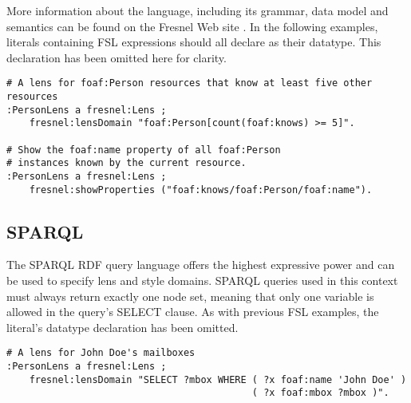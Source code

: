 More information about the language, including its grammar, data model and semantics can be found on the Fresnel Web site \cite{fsl05}. In the following examples, literals containing FSL expressions should all declare  as their datatype. This declaration has been omitted here for clarity.

\begin{small}
\begin{verbatim}
# A lens for foaf:Person resources that know at least five other resources
:PersonLens a fresnel:Lens ;
    fresnel:lensDomain "foaf:Person[count(foaf:knows) >= 5]".

# Show the foaf:name property of all foaf:Person
# instances known by the current resource.
:PersonLens a fresnel:Lens ;
    fresnel:showProperties ("foaf:knows/foaf:Person/foaf:name").
\end{verbatim}
\end{small}

\subsection{SPARQL}

The SPARQL RDF query language \cite{sparql05} offers the highest expressive power and can be used to specify lens and style domains. SPARQL queries used in this context must always return exactly one node set, meaning that only one variable is allowed in the query's SELECT clause. As with previous FSL examples, the literal's datatype declaration has been omitted.

\begin{small}
\begin{verbatim}
# A lens for John Doe's mailboxes
:PersonLens a fresnel:Lens ;
    fresnel:lensDomain "SELECT ?mbox WHERE ( ?x foaf:name 'John Doe' )
                                           ( ?x foaf:mbox ?mbox )".
\end{verbatim}
\end{small}



